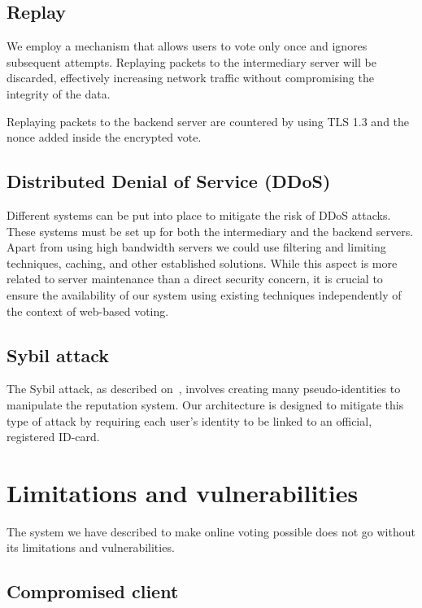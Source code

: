 \documentclass[a4paper,12pt,english]{article}
\begin{document}
\subsection{Replay}\label{sec:attack-replay}

We employ a mechanism that allows users to vote only once and ignores subsequent attempts. Replaying packets to the intermediary server will be discarded, effectively increasing network traffic without compromising the integrity of the data.

Replaying packets to the backend server are countered by using TLS 1.3 and the nonce added inside the encrypted vote.

\subsection{Distributed Denial of Service (DDoS)}\label{sec:attack-ddos}

Different systems can be put into place to mitigate the risk of DDoS attacks. These systems must be set up for both the intermediary and the backend servers. Apart from using high bandwidth servers we could use filtering and limiting techniques, caching, and other established solutions. While this aspect is more related to server maintenance than a direct security concern, it is crucial to ensure the availability of our system using existing techniques independently of the context of web-based voting.

\subsection{Sybil attack}\label{sec:attack-sybil}

The Sybil attack, as described on~\cite{wikipedia-contributors-2023}, involves creating many pseudo-identities to manipulate the reputation system. Our architecture is designed to mitigate this type of attack by requiring each user's identity to be linked to an official, registered ID-card.

\section{Limitations and vulnerabilities}\label{sec:limitations}

The system we have described to make online voting possible does not go without its limitations and vulnerabilities.

\subsection{Compromised client}\label{sec:limit-client}
\end{document}
